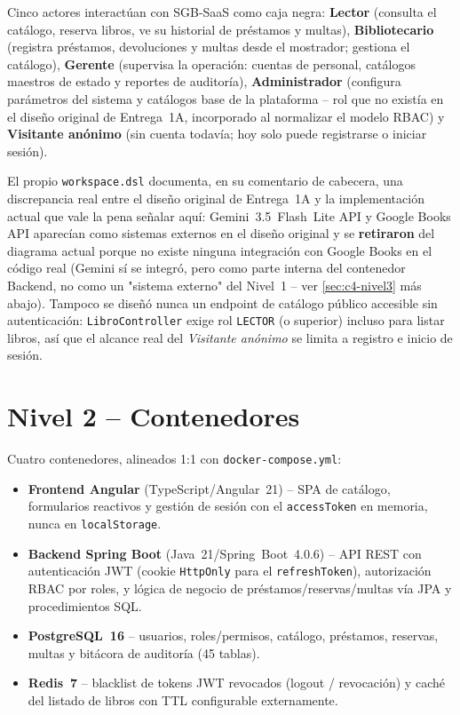 Cinco actores interactúan con SGB-SaaS como caja negra: \textbf{Lector}
(consulta el catálogo, reserva libros, ve su historial de préstamos y
multas), \textbf{Bibliotecario} (registra préstamos, devoluciones y
multas desde el mostrador; gestiona el catálogo),
\textbf{Gerente} (supervisa la operación: cuentas de personal, catálogos
maestros de estado y reportes de auditoría), \textbf{Administrador}
(configura parámetros del sistema y catálogos base de la plataforma --
rol que no existía en el diseño original de Entrega~1A, incorporado al
normalizar el modelo RBAC) y \textbf{Visitante anónimo} (sin cuenta
todavía; hoy solo puede registrarse o iniciar sesión).

El propio \texttt{workspace.dsl} documenta, en su comentario de
cabecera, una discrepancia real entre el diseño original de Entrega~1A y
la implementación actual que vale la pena señalar aquí: Gemini~3.5~Flash~Lite
API y Google Books API aparecían como sistemas externos en el diseño
original y se \textbf{retiraron} del diagrama actual porque no existe
ninguna integración con Google Books en el código real (Gemini sí se
integró, pero como parte interna del contenedor Backend, no como un
"sistema externo" del Nivel~1 -- ver \autoref{sec:c4-nivel3} más
abajo). Tampoco se
diseñó nunca un endpoint de catálogo público accesible sin
autenticación: \texttt{LibroController} exige rol \texttt{LECTOR} (o
superior) incluso para listar libros, así que el alcance real del
\emph{Visitante anónimo} se limita a registro e inicio de sesión.

\section{Nivel 2 -- Contenedores}

Cuatro contenedores, alineados 1:1 con \texttt{docker-compose.yml}:

\begin{itemize}[leftmargin=1.2cm]
  \item \textbf{Frontend Angular} (TypeScript/Angular~21) -- SPA de
    catálogo, formularios reactivos y gestión de sesión con el
    \texttt{accessToken} en memoria, nunca en \texttt{localStorage}.
  \item \textbf{Backend Spring Boot} (Java~21/Spring~Boot~4.0.6) -- API
    REST con autenticación JWT (cookie \texttt{HttpOnly} para el
    \texttt{refreshToken}), autorización RBAC por roles, y lógica de
    negocio de préstamos/reservas/multas vía JPA y procedimientos SQL.
  \item \textbf{PostgreSQL~16} -- usuarios, roles/permisos, catálogo,
    préstamos, reservas, multas y bitácora de auditoría (45 tablas).
  \item \textbf{Redis~7} -- blacklist de tokens JWT revocados (logout /
    revocación) y caché del listado de libros con TTL configurable
    externamente.
  \end{itemize}

